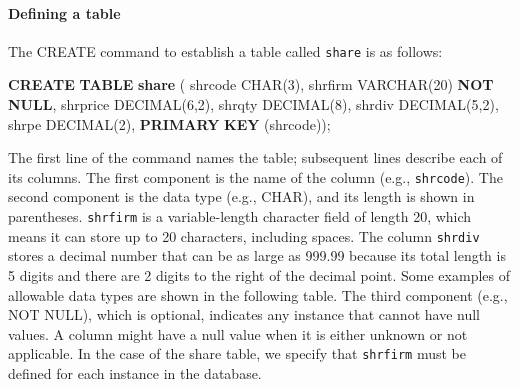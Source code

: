 \documentclass[
]{article}
\newenvironment{Shaded}{\begin{snugshade}}{\end{snugshade}}
\newcommand{\DataTypeTok}[1]{\textcolor[rgb]{0.13,0.29,0.53}{#1}}
\newcommand{\DecValTok}[1]{\textcolor[rgb]{0.00,0.00,0.81}{#1}}
\newcommand{\KeywordTok}[1]{\textcolor[rgb]{0.13,0.29,0.53}{\textbf{#1}}}
\newcommand{\NormalTok}[1]{#1}
\begin{document}
\hypertarget{defining-a-table}{%
\paragraph*{Defining a table}\label{defining-a-table}}

The CREATE command to establish a table called \texttt{share} is as follows:

\begin{Shaded}
\begin{Highlighting}[]
\KeywordTok{CREATE} \KeywordTok{TABLE} \KeywordTok{share}\NormalTok{ (}
\NormalTok{  shrcode }\DataTypeTok{CHAR}\NormalTok{(}\DecValTok{3}\NormalTok{),}
\NormalTok{  shrfirm }\DataTypeTok{VARCHAR}\NormalTok{(}\DecValTok{20}\NormalTok{) }\KeywordTok{NOT} \KeywordTok{NULL}\NormalTok{,}
\NormalTok{  shrprice }\DataTypeTok{DECIMAL}\NormalTok{(}\DecValTok{6}\NormalTok{,}\DecValTok{2}\NormalTok{),}
\NormalTok{  shrqty }\DataTypeTok{DECIMAL}\NormalTok{(}\DecValTok{8}\NormalTok{),}
\NormalTok{  shrdiv }\DataTypeTok{DECIMAL}\NormalTok{(}\DecValTok{5}\NormalTok{,}\DecValTok{2}\NormalTok{),}
\NormalTok{  shrpe }\DataTypeTok{DECIMAL}\NormalTok{(}\DecValTok{2}\NormalTok{),}
  \KeywordTok{PRIMARY} \KeywordTok{KEY}\NormalTok{ (shrcode));}
\end{Highlighting}
\end{Shaded}

The first line of the command names the table; subsequent lines describe each of its columns. The first component is the name of the column (e.g., \texttt{shrcode}). The second component is the data type (e.g., CHAR), and its length is shown in parentheses. \texttt{shrfirm} is a variable-length character field of length 20, which means it can store up to 20 characters, including spaces. The column \texttt{shrdiv} stores a decimal number that can be as large as 999.99 because its total length is 5 digits and there are 2 digits to the right of the decimal point. Some examples of allowable data types are shown in the following table. The third component (e.g., NOT NULL), which is optional, indicates any instance that cannot have null values. A column might have a null value when it is either unknown or not applicable. In the case of the share table, we specify that \texttt{shrfirm} must be defined for each instance in the database.
\end{document}

